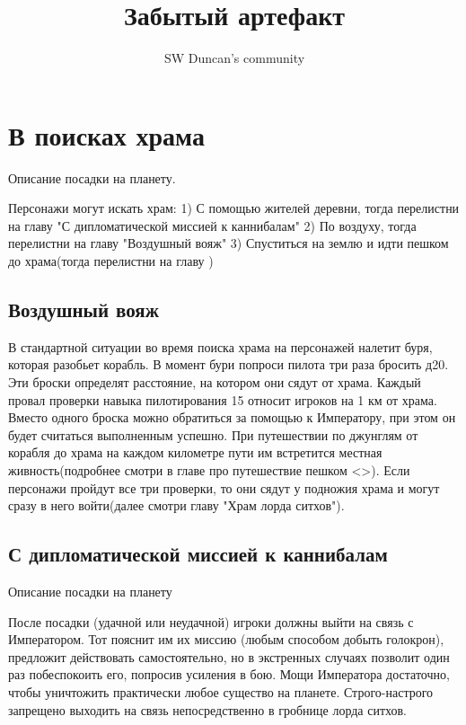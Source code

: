 \documentclass{article}
\title{Забытый артефакт}
\author{SW Duncan's community}
\begin{document}
\pagecolor{sky_black}
\BgThispage
\maketitle %
\newpage
\tableofcontents %
\newpage
\section{В поисках храма}

Описание посадки на планету.
\begin{myquote}
\color{sw}

\end{myquote}
Персонажи могут искать храм:
1) С помощью жителей деревни, тогда перелистни на главу "С дипломатической миссией к каннибалам"
2) По воздуху, тогда перелистни на главу "Воздушный вояж"
3) Спуститься на землю и идти пешком до храма(тогда перелистни на главу )
\subsection{Воздушный вояж}
В стандартной ситуации во время поиска храма на персонажей налетит буря, которая разобьет корабль.
В момент бури попроси пилота три раза бросить д20. Эти броски определят расстояние, на котором они сядут от храма.
Каждый провал проверки навыка пилотирования 15 относит игроков на 1 км от храма. Вместо одного броска можно обратиться за помощью к Императору, при этом он будет считаться выполненным успешно. При путешествии по джунглям от корабля до храма на каждом километре пути им встретится местная живность(подробнее смотри в главе про путешествие пешком <>). Если персонажи пройдут все три проверки, то они сядут у подножия храма и могут сразу в него войти(далее смотри главу "Храм лорда ситхов").

\begin{myquote}
\color{sw}

\end{myquote}
\subsection{С дипломатической миссией к каннибалам}
Описание посадки на планету
\begin{myquote}
\color{sw}

\end{myquote}
После посадки (удачной или неудачной) игроки должны выйти на связь с Императором. Тот пояснит им их миссию (любым способом добыть голокрон), предложит действовать самостоятельно, но в экстренных случаях позволит один раз побеспокоить его, попросив усиления в бою. Мощи Императора достаточно, чтобы уничтожить практически любое существо на планете. Строго-настрого запрещено выходить на связь непосредственно в гробнице лорда ситхов.
\end{document}
